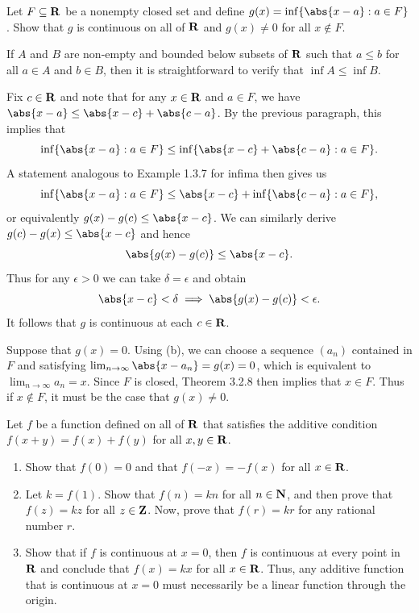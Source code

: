 \documentclass{lew98_solutions}
\begin{document}
\begin{exercise}
\label{ex:4.3.12}
    Let \( F \subseteq \mathbf{R} \) be a nonempty closed set and define \( g(x) = \inf \{ \abs{x - a} : a \in F \} \). Show that \( g \) is continuous on all of \( \mathbf{R} \) and \( g(x) \neq 0 \) for all \( x \not\in F \).
\end{exercise}

\begin{solution}
    If \( A \) and \( B \) are non-empty and bounded below subsets of \( \mathbf{R} \) such that \( a \leq b \) for all \( a \in A \) and \( b \in B \), then it is straightforward to verify that \( \inf A \leq \inf B \).
    
    Fix \( c \in \mathbf{R} \) and note that for any \( x \in \mathbf{R} \) and \( a \in F \), we have \( \abs{x - a} \leq \abs{x - c} + \abs{c - a} \). By the previous paragraph, this implies that
    \[
        \inf \{ \abs{x - a} : a \in F \} \leq \inf \{ \abs{x - c} + \abs{c - a} : a \in F \}.
    \]
    A statement analogous to Example 1.3.7 for infima then gives us
    \[
        \inf \{ \abs{x - a} : a \in F \} \leq \abs{x - c} + \inf \{ \abs{c - a} : a \in F \},
    \]
    or equivalently \( g(x) - g(c) \leq \abs{x - c} \). We can similarly derive \( g(c) - g(x) \leq \abs{x - c} \) and hence
    \[
        \abs{g(x) - g(c)} \leq \abs{x - c}.
    \]
    Thus for any \( \epsilon > 0 \) we can take \( \delta = \epsilon \) and obtain
    \[
        \abs{x - c} < \delta \implies \abs{g(x) - g(c)} < \epsilon.
    \]
    It follows that \( g \) is continuous at each \( c \in \mathbf{R} \).

    Suppose that \( g(x) = 0 \). Using  (b), we can choose a sequence \( (a_n) \) contained in \( F \) and satisfying \( \lim_{n \to \infty} \abs{x - a_n} = g(x) = 0 \), which is equivalent to \( \lim_{n \to \infty} a_n = x \). Since \( F \) is closed, Theorem 3.2.8 then implies that \( x \in F \). Thus if \( x \not\in F \), it must be the case that \( g(x) \neq 0 \).
\end{solution}

\begin{exercise}
\label{ex:4.3.13}
    Let \( f \) be a function defined on all of \( \mathbf{R} \) that satisfies the additive condition \( f(x + y) = f(x) + f(y) \) for all \( x, y \in \mathbf{R} \).
    \begin{enumerate}
        \item Show that \( f(0) = 0 \) and that \( f(-x) = -f(x) \) for all \( x \in \mathbf{R} \).

        \item Let \( k = f(1) \). Show that \( f(n) = kn \) for all \( n \in \mathbf{N} \), and then prove that \( f(z) = kz \) for all \( z \in \mathbf{Z} \). Now, prove that \( f(r) = kr \) for any rational number \( r \).

        \item Show that if \( f \) is continuous at \( x = 0 \), then \( f \) is continuous at every point in \( \mathbf{R} \) and conclude that \( f(x) = kx \) for all \( x \in \mathbf{R} \). Thus, any additive function that is continuous at \( x = 0 \) must necessarily be a linear function through the origin.
    \end{enumerate}
\end{exercise}
\end{document}

